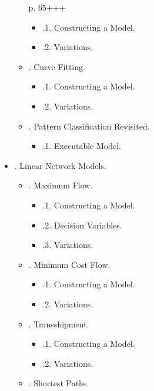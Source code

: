 \documentclass{article}
\begin{document}
\begin{itemize}
\begin{itemize}
        p. 65+++

        \begin{itemize}
            \item {.1. Constructing a Model.}
            \item {.2. Variations.}
        \end{itemize}
        \item {. Curve Fitting.}
        \begin{itemize}
            \item {.1. Constructing a Model.}
            \item {.2. Variations.}
        \end{itemize}
        \item {. Pattern Classification Revisited.}
        \begin{itemize}
            \item {.1. Executable Model.}
        \end{itemize}
    \end{itemize}
    \item {. Linear Network Models.}
    \begin{itemize}
        \item {. Maximum Flow.}
        \begin{itemize}
            \item {.1. Constructing a Model.}
            \item {.2. Decision Variables.}
            \item {.3. Variations.}
        \end{itemize}
        \item {. Minimum Cost Flow.}
        \begin{itemize}
            \item {.1. Constructing a Model.}
            \item {.2. Variations.}
        \end{itemize}
        \item {. Transshipment.}
        \begin{itemize}
            \item {.1. Constructing a Model.}
            \item {.2. Variations.}
        \end{itemize}
        \item {. Shortest Paths.}
        \begin{itemize}

\end{itemize}
\end{itemize}
\end{itemize}
\end{document}
